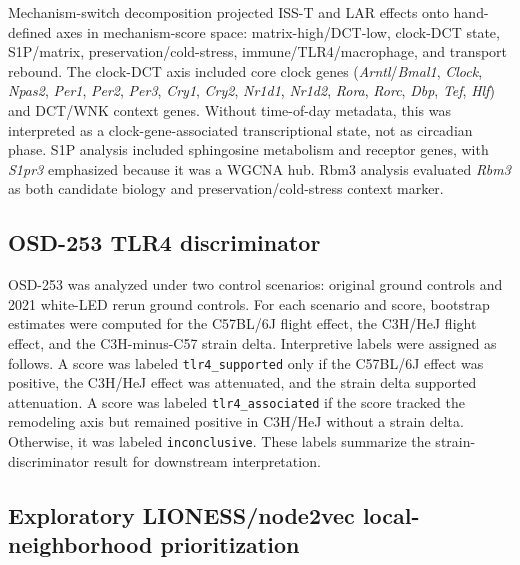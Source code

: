 \documentclass[11pt]{article}
\newcommand{\code}[1]{\texttt{#1}}
\newcommand{\gene}[1]{\textit{#1}}
\begin{document}
Mechanism-switch decomposition projected ISS-T and LAR effects onto hand-defined axes in mechanism-score space: matrix-high/DCT-low, clock-DCT state, S1P/matrix, preservation/cold-stress, immune/TLR4/macrophage, and transport rebound. The clock-DCT axis included core clock genes (\gene{Arntl}/\gene{Bmal1}, \gene{Clock}, \gene{Npas2}, \gene{Per1}, \gene{Per2}, \gene{Per3}, \gene{Cry1}, \gene{Cry2}, \gene{Nr1d1}, \gene{Nr1d2}, \gene{Rora}, \gene{Rorc}, \gene{Dbp}, \gene{Tef}, \gene{Hlf}) and DCT/WNK context genes. Without time-of-day metadata, this was interpreted as a clock-gene-associated transcriptional state, not as circadian phase. S1P analysis included sphingosine metabolism and receptor genes, with \gene{S1pr3} emphasized because it was a WGCNA hub. Rbm3 analysis evaluated \gene{Rbm3} as both candidate biology and preservation/cold-stress context marker.

\subsection{OSD-253 TLR4 discriminator}

OSD-253 was analyzed under two control scenarios: original ground controls and 2021 white-LED rerun ground controls. For each scenario and score, bootstrap estimates were computed for the C57BL/6J flight effect, the C3H/HeJ flight effect, and the C3H-minus-C57 strain delta. Interpretive labels were assigned as follows. A score was labeled \code{tlr4\_supported} only if the C57BL/6J effect was positive, the C3H/HeJ effect was attenuated, and the strain delta supported attenuation. A score was labeled \code{tlr4\_associated} if the score tracked the remodeling axis but remained positive in C3H/HeJ without a strain delta. Otherwise, it was labeled \code{inconclusive}. These labels summarize the strain-discriminator result for downstream interpretation.

\subsection{Exploratory LIONESS/node2vec local-neighborhood prioritization}
\end{document}
